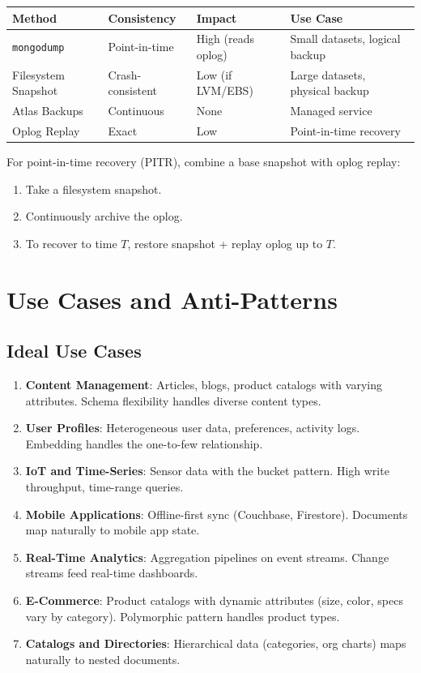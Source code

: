 \documentclass[12pt,a4paper]{article}
\begin{document}
\begin{center}
\begin{tabular}{@{}llll@{}}
\toprule
\textbf{Method} & \textbf{Consistency} & \textbf{Impact} & \textbf{Use Case} \\
\midrule
\texttt{mongodump} & Point-in-time & High (reads oplog) & Small datasets, logical backup \\
Filesystem Snapshot & Crash-consistent & Low (if LVM/EBS) & Large datasets, physical backup \\
Atlas Backups & Continuous & None & Managed service \\
Oplog Replay & Exact & Low & Point-in-time recovery \\
\bottomrule
\end{tabular}
\end{center}

For point-in-time recovery (PITR), combine a base snapshot with oplog replay:
\begin{enumerate}[noitemsep]
    \item Take a filesystem snapshot.
    \item Continuously archive the oplog.
    \item To recover to time $T$, restore snapshot + replay oplog up to $T$.
\end{enumerate}

\section{Use Cases and Anti-Patterns}

\subsection{Ideal Use Cases}

\begin{enumerate}[noitemsep]
    \item \textbf{Content Management}: Articles, blogs, product catalogs with varying attributes. Schema flexibility handles diverse content types.
    \item \textbf{User Profiles}: Heterogeneous user data, preferences, activity logs. Embedding handles the one-to-few relationship.
    \item \textbf{IoT and Time-Series}: Sensor data with the bucket pattern. High write throughput, time-range queries.
    \item \textbf{Mobile Applications}: Offline-first sync (Couchbase, Firestore). Documents map naturally to mobile app state.
    \item \textbf{Real-Time Analytics}: Aggregation pipelines on event streams. Change streams feed real-time dashboards.
    \item \textbf{E-Commerce}: Product catalogs with dynamic attributes (size, color, specs vary by category). Polymorphic pattern handles product types.
    \item \textbf{Catalogs and Directories}: Hierarchical data (categories, org charts) maps naturally to nested documents.
\end{enumerate}
\end{document}
